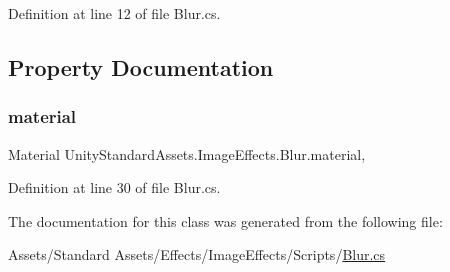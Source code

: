 Definition at line 12 of file Blur.\+cs.



\subsection{Property Documentation}
\mbox{\label{class_unity_standard_assets_1_1_image_effects_1_1_blur_aa9a1c99d318055ed40e44b47189e3980}} 
\subsubsection{\texorpdfstring{material}{material}}
{\footnotesize\ttfamily Material Unity\+Standard\+Assets.\+Image\+Effects.\+Blur.\+material\hspace{0.3cm}{\ttfamily [get]}, {\ttfamily [protected]}}



Definition at line 30 of file Blur.\+cs.



The documentation for this class was generated from the following file\+:\begin{DoxyCompactItemize}
\item 
Assets/\+Standard Assets/\+Effects/\+Image\+Effects/\+Scripts/\mbox{\hyperlink{_blur_8cs}{Blur.\+cs}}\end{DoxyCompactItemize}
